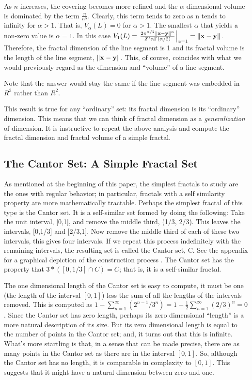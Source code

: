 As $n$ increases, the covering becomes more refined and 
the $\alpha$ dimensional volume is dominated by the term
$\frac{n}{n^\alpha}$. Clearly, this term tends to zero as n tends to
infinity for $\alpha > 1$. That is, $V_\alpha(L) = 0$ for $\alpha >
1$. The smallest $\alpha$ that yields a non-zero value is $\alpha =
1$. In this case 
$
V_1(L) = \left. \frac{2\pi^{\alpha / 2} \|{\bf x} - {\bf
y}\|^\alpha}{2^\alpha \alpha \Gamma(\alpha / 2)} \right|_{\alpha=1} = \| {\bf
x} - {\bf y}\|$. 
Therefore, the fractal dimension of the line segment is
1 and its fractal volume is the length of the line segment, $\|{\bf x} - {\bf
y}\|$. This, of course, coincides with what we would previously regard
as the dimension and ``volume'' of a line segment.

Note that the answer would stay the same if the line segment was 
embedded in $R^3$ rather than $R^2$.


This result is true for any ``ordinary'' set: its fractal dimension is its
``ordinary'' dimension. This means that we can think of fractal
dimension as a {\it generalization} of dimension. It is 
instructive to repeat the above analysis and compute the fractal dimension 
and fractal volume of a simple fractal.


\subsection{The Cantor Set: A Simple Fractal Set}

As mentioned at the beginning of this paper, the simplest fractals to
study are the ones with regular behavior; in particular, fractals with a
self similarity property are more mathematically tractable. Perhaps
the simplest fractal of this type is 
the Cantor set. It is a self-similar set formed by doing the following:
Take the unit interval, [0,1], and remove the middle third, (1/3,
2/3). This leaves the intervals, [0,1/3] and [2/3,1]. Now remove the
middle third of each of these two intervals, this gives four
intervals.
If we repeat this process indefinitely with the remaining
intervals, the resulting set is called the Cantor set, C. See 
the appendix for a graphical depiction of the construction process . 
The Cantor
set has the property that $3 * \left([0,1/3] \cap C\right) = C$; that is, 
it is a self-similar fractal. 

The one dimensional length of the Cantor set is
easy to compute, it must be one (the length of the interval $[0,1]$) 
less the sum of all the lengths of the
intervals removed. This is computed as $1
- \sum_{n=1}^\infty (2^{n-1}/3^n) = 1 - \frac{1}{2}
\sum_{n=1}^\infty (2/3)^n = 0$. Since the Cantor set has zero length,
perhaps its zero dimensional ``length'' is a more natural description
of its size. But its zero dimensional length is equal to the 
number of points in the Cantor set; and, it turns out that this is infinite. 
What's more startling is
that, in a sense that can be made precise, there are as many points in
the Cantor set as there are in the interval $[0,1]$. So, although the 
Cantor set has no length, it is comparable in complexity
to $[0,1]$. This suggests that it might have a natural dimension
between zero and one.

